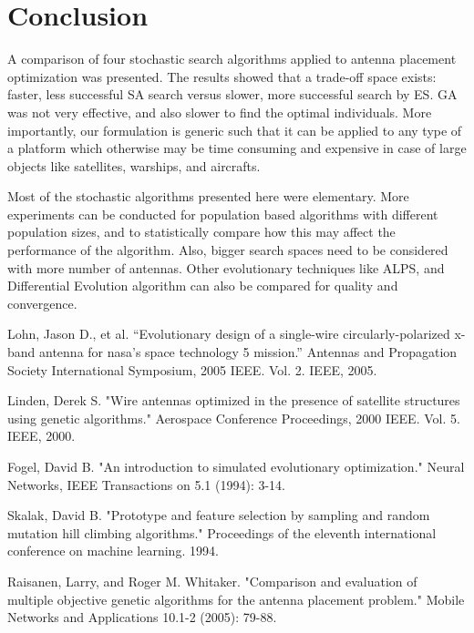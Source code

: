 \documentclass[conference]{IEEEtran}
\begin{document}
\section{Conclusion}
A comparison of four stochastic search algorithms applied to antenna placement optimization was presented. The results showed that a trade-off space exists: faster, less successful SA search versus slower, more successful search by ES. GA was not very effective, and also slower to find the optimal individuals. More importantly, our formulation is generic such that it can be applied to any type of a platform which otherwise may be time consuming and expensive in case of large objects like satellites, warships, and aircrafts. 

Most of the stochastic algorithms presented here were elementary. More experiments can be conducted for population based algorithms with different population sizes, and to statistically compare how this may affect the performance of the algorithm. Also, bigger search spaces need to be considered with more number of antennas. Other evolutionary techniques like ALPS, and Differential Evolution algorithm can also be compared for quality and convergence.

\begin{thebibliography}{1}

Lohn, Jason D., et al. ``Evolutionary design of a single-wire circularly-polarized x-band antenna for nasa's space technology 5 mission.'' Antennas and Propagation Society International Symposium, 2005 IEEE. Vol. 2. IEEE, 2005.

Linden, Derek S. "Wire antennas optimized in the presence of satellite structures using genetic algorithms." Aerospace Conference Proceedings, 2000 IEEE. Vol. 5. IEEE, 2000.

Fogel, David B. "An introduction to simulated evolutionary optimization." Neural Networks, IEEE Transactions on 5.1 (1994): 3-14.

Skalak, David B. "Prototype and feature selection by sampling and random mutation hill climbing algorithms." Proceedings of the eleventh international conference on machine learning. 1994.

Raisanen, Larry, and Roger M. Whitaker. "Comparison and evaluation of multiple objective genetic algorithms for the antenna placement problem." Mobile Networks and Applications 10.1-2 (2005): 79-88.
\end{thebibliography}
\end{document}

